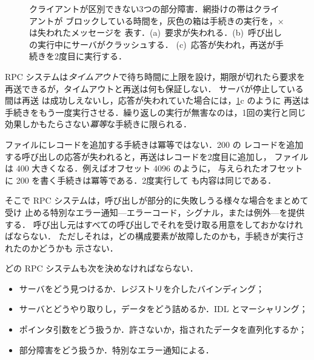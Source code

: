 \documentclass[../main.tex]{subfiles}
\begin{document}
\begin{figure}[htbp]
  \centering
  
  \caption{クライアントが区別できない3つの部分障害．網掛けの帯はクライアントが
    ブロックしている時間を，灰色の箱は手続きの実行を，×は失われたメッセージを
    表す．(a)~要求が失われる．(b)~呼び出しの実行中にサーバがクラッシュする．
    (c)~応答が失われ，再送が手続きを2度目に実行する．}
  \label{fig:l13-failures}
\end{figure}

RPC システムは\emph{タイムアウト}で待ち時間に上限を設け，期限が切れたら要求を
再送できるが，タイムアウトと再送は何も保証しない．%
サーバが停止している間は再送
は成功しえないし，応答が失われていた場合には，\cref{fig:l13-failures}c のように
再送は手続きをもう一度実行させる．繰り返しの実行が無害なのは，1回の実行と同じ
効果しかもたらさない\emph{冪等}な手続きに限られる．

\begin{example}
  ファイルにレコードを追加する手続きは冪等ではない．\SI{200}{\byte} の
  レコードを追加する呼び出しの応答が失われると，再送はレコードを2度目に追加し，
  ファイルは \SI{400}{\byte} 大きくなる．例えばオフセット \num{4096} のように，
  与えられたオフセットに \SI{200}{\byte} を書く手続きは冪等である．2度実行して
  も内容は同じである．
\end{example}

そこで RPC システムは，呼び出しが部分的に失敗しうる様々な場合をまとめて受け
止める特別なエラー通知---エラーコード，シグナル，または例外---を提供する．
呼び出し元はすべての呼び出しでそれを受け取る用意をしておかなければならない．
ただしそれは，どの構成要素が故障したのかも，手続きが実行されたのかどうかも
示さない．

\begin{keypoint}
  どの RPC システムも次を決めなければならない．
  \begin{itemize}
    \item サーバをどう見つけるか．レジストリを介したバインディング；
    \item サーバとどうやり取りし，データをどう詰めるか．IDL とマーシャリング；
    \item ポインタ引数をどう扱うか．許さないか，指されたデータを直列化するか；
    \item 部分障害をどう扱うか．特別なエラー通知による．
  \end{itemize}
\end{keypoint}
\end{document}
